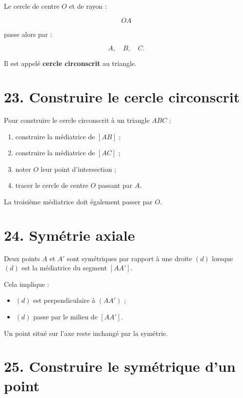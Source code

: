 
Le cercle de centre $O$ et de rayon :

\[
OA
\]

passe alors par :

\[
A,\quad B,\quad C.
\]

Il est appelé \textbf{cercle circonscrit} au triangle.

\section{23. Construire le cercle circonscrit}

Pour construire le cercle circonscrit à un triangle $ABC$ :

\begin{enumerate}
\item construire la médiatrice de $[AB]$ ;
\item construire la médiatrice de $[AC]$ ;
\item noter $O$ leur point d’intersection ;
\item tracer le cercle de centre $O$ passant par $A$.
\end{enumerate}

La troisième médiatrice doit également passer par $O$.

\section{24. Symétrie axiale}

Deux points $A$ et $A'$ sont symétriques par rapport à une droite $(d)$ lorsque $(d)$ est la médiatrice du segment $[AA']$.

Cela implique :

\begin{itemize}
\item $(d)$ est perpendiculaire à $(AA')$ ;
\item $(d)$ passe par le milieu de $[AA']$.
\end{itemize}

Un point situé sur l’axe reste inchangé par la symétrie.

\section{25. Construire le symétrique d’un point}

